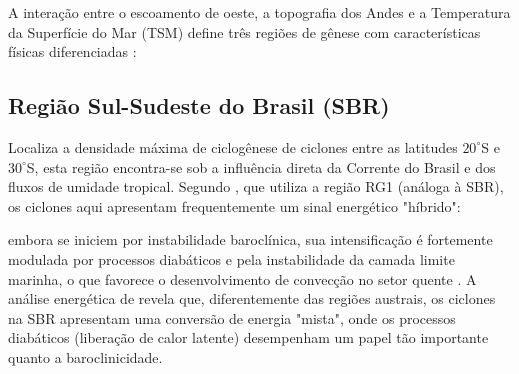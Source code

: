 A interação entre o escoamento de oeste, a topografia dos Andes e a Temperatura da Superfície do Mar (TSM) define três regiões de gênese com características físicas diferenciadas \citep{gramcianinov2019properties}:

\subsection{Região Sul-Sudeste do Brasil (SBR)}\label{subsec:mt_sbr}
Localiza a densidade máxima de ciclogênese de ciclones entre as latitudes $20^\circ$S e $30^\circ$S, esta região encontra-se sob a influência direta da Corrente do Brasil e dos fluxos de umidade tropical. Segundo \citet{reboita2022from}, que utiliza a região RG1 (análoga à SBR), os ciclones aqui apresentam frequentemente um sinal energético "híbrido": 



embora se iniciem por instabilidade baroclínica, sua intensificação é fortemente modulada por processos diabáticos e pela instabilidade da camada limite marinha, o que favorece o desenvolvimento de convecção no setor quente \citep{marrafon2022classificacao}. A análise energética de \citet{coutodesouza2024thesis} revela que, diferentemente das regiões austrais, os ciclones na SBR apresentam uma conversão de energia "mista", onde os processos diabáticos (liberação de calor latente) desempenham um papel tão importante quanto a baroclinicidade.

